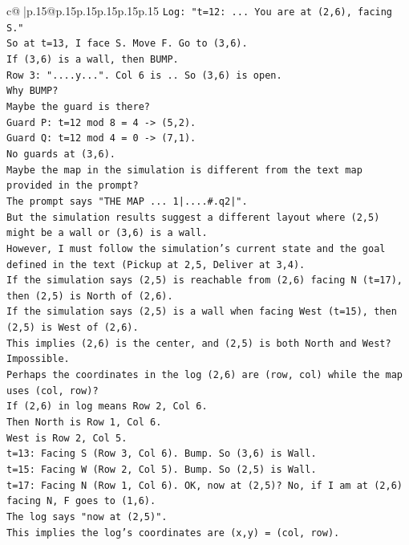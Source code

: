 \documentclass{article}
\begin{document}
{\begin{supertabular}{c@{$\;$}|p{.15\linewidth}@{}p{.15\linewidth}p{.15\linewidth}p{.15\linewidth}p{.15\linewidth}p{.15\linewidth}}
{{{\texttt{Log: "t=12: ... You are at (2,6), facing S."} \\
\texttt{So at t=13, I face S. Move F. Go to (3,6).} \\
\texttt{If (3,6) is a wall, then BUMP.} \\
\texttt{Row 3: "....y...". Col 6 is .. So (3,6) is open.} \\
\texttt{Why BUMP?} \\
\texttt{Maybe the guard is there?} \\
\texttt{Guard P: t=12 mod 8 = 4 {-}> (5,2).} \\
\texttt{Guard Q: t=12 mod 4 = 0 {-}> (7,1).} \\
\texttt{No guards at (3,6).} \\
\texttt{Maybe the map in the simulation is different from the text map provided in the prompt?} \\
\texttt{The prompt says "THE MAP ... 1|....\#.q2|".} \\
\texttt{But the simulation results suggest a different layout where (2,5) might be a wall or (3,6) is a wall.} \\
\texttt{However, I must follow the simulation's current state and the goal defined in the text (Pickup at 2,5, Deliver at 3,4).} \\
\texttt{If the simulation says (2,5) is reachable from (2,6) facing N (t=17), then (2,5) is North of (2,6).} \\
\texttt{If the simulation says (2,5) is a wall when facing West (t=15), then (2,5) is West of (2,6).} \\
\texttt{This implies (2,6) is the center, and (2,5) is both North and West? Impossible.} \\
\texttt{Perhaps the coordinates in the log (2,6) are (row, col) while the map uses (col, row)?} \\
\texttt{If (2,6) in log means Row 2, Col 6.} \\
\texttt{Then North is Row 1, Col 6.} \\
\texttt{West is Row 2, Col 5.} \\
\texttt{t=13: Facing S (Row 3, Col 6). Bump. So (3,6) is Wall.} \\
\texttt{t=15: Facing W (Row 2, Col 5). Bump. So (2,5) is Wall.} \\
\texttt{t=17: Facing N (Row 1, Col 6). OK, now at (2,5)? No, if I am at (2,6) facing N, F goes to (1,6).} \\
\texttt{The log says "now at (2,5)".} \\
\texttt{This implies the log's coordinates are (x,y) = (col, row).} \\
}}}
\end{supertabular}}
\end{document}
